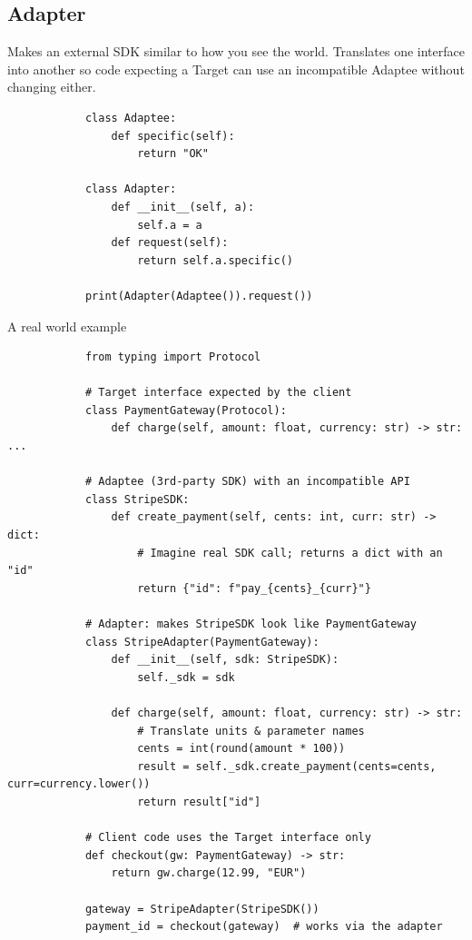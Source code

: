    \subsection{Adapter}
        Makes an external SDK similar to how you see the world. Translates one interface into another so code expecting a Target can use an incompatible Adaptee without changing either.
        \begin{verbatim}
            class Adaptee:
                def specific(self):
                    return "OK"

            class Adapter:
                def __init__(self, a):
                    self.a = a
                def request(self):
                    return self.a.specific()

            print(Adapter(Adaptee()).request())
        \end{verbatim}
        A real world example
        \begin{verbatim}
            from typing import Protocol

            # Target interface expected by the client
            class PaymentGateway(Protocol):
                def charge(self, amount: float, currency: str) -> str: ...

            # Adaptee (3rd-party SDK) with an incompatible API
            class StripeSDK:
                def create_payment(self, cents: int, curr: str) -> dict:
                    # Imagine real SDK call; returns a dict with an "id"
                    return {"id": f"pay_{cents}_{curr}"}

            # Adapter: makes StripeSDK look like PaymentGateway
            class StripeAdapter(PaymentGateway):
                def __init__(self, sdk: StripeSDK):
                    self._sdk = sdk

                def charge(self, amount: float, currency: str) -> str:
                    # Translate units & parameter names
                    cents = int(round(amount * 100))
                    result = self._sdk.create_payment(cents=cents, curr=currency.lower())
                    return result["id"]

            # Client code uses the Target interface only
            def checkout(gw: PaymentGateway) -> str:
                return gw.charge(12.99, "EUR")

            gateway = StripeAdapter(StripeSDK())
            payment_id = checkout(gateway)  # works via the adapter
        \end{verbatim}

